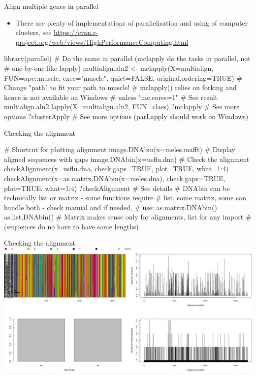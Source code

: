 \documentclass[compress, ucs, xelatex, 11pt, xcolor=svgnames,
  hyperref={
    bookmarks=true,
    unicode=true,
    colorlinks=true,
    pdftitle={Molecular data in R},
    plainpages=false,
    pdfauthor={Vojtech Zeisek},
    pdfsubject={Course about phylogeny and evolution in R},
    pdfcreator={XeLaTeX},
    pdfkeywords={R, evolution, phylogeny, molecular data},
    linkcolor=Tomato,
    anchorcolor=SaddleBrown,
    citecolor=Goldenrod,
    filecolor=DarkMagenta,
    menucolor=Sienna,
    urlcolor=DarkTurquoise,
    pdftex},
  url={hyphens, lowtilde} %
  ]{beamer}
\begin{document}
\begin{frame}[fragile]{Align multiple genes in parallel}
  \begin{itemize}
    \item There are plenty of implementations of parallelisation and using of computer clusters, see \url{https://cran.r-project.org/web/views/HighPerformanceComputing.html}
  \end{itemize}
  \begin{spluscode}
    library(parallel)
    # Do the same in parallel (mclapply do the tasks in parallel, not
    # one-by-one like lapply)
    multialign.aln2 <- mclapply(X=multialign, FUN=ape::muscle, 
      exec="muscle", quiet=FALSE, original.ordering=TRUE)
    # Change "path" to fit your path to muscle!
    # mclapply() relies on forking and hence is not available on Windows
    # unless "mc.cores=1"
    # See result
    multialign.aln2
    lapply(X=multialign.aln2, FUN=class)
    ?mclapply # See more options
    ?clusterApply # See more options (parLapply should work on Windows)
  \end{spluscode}
\end{frame}

\begin{frame}[fragile]{Checking the alignment}
  \begin{spluscode}
    # Shortcut for plotting alignment
    image.DNAbin(x=meles.mafft)
    # Display aligned sequences with gaps
    image.DNAbin(x=usflu.dna)
    # Check the alignment
    checkAlignment(x=usflu.dna, check.gaps=TRUE, plot=TRUE, what=1:4)
    checkAlignment(x=as.matrix.DNAbin(x=meles.dna), check.gaps=TRUE,
      plot=TRUE, what=1:4)
    ?checkAlignment # See details
    # DNAbin can be technically list or matrix - some functions require
    # list, some matrix, some can handle both - check manual and if needed,
    # use:
    as.matrix.DNAbin()
    as.list.DNAbin()
    # Matrix makes sense only for alignments, list for any import
    # (sequences do no have to have same lengths)
  \end{spluscode}
\end{frame}

\begin{frame}{Checking the alignment}
  \includegraphics[width=\textwidth]{checkalignment.png}
\end{frame}
\end{document}
